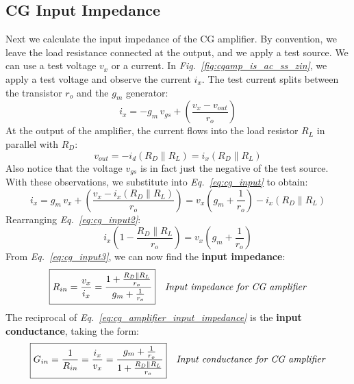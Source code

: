 \subsection{CG Input Impedance}
Next we calculate the input impedance of the CG amplifier.  By convention, we leave the load resistance connected at the output, and we apply a test source.  We can use a test voltage $v_x$ or a current.  In \emph{Fig.~\ref{fig:cgamp_is_ac_ss_zin}}, we apply a test voltage and observe the current $i_x$.  The test current splits between the transistor $r_o$ and the $g_m$ generator:
    \begin{equation}
        i_x = -g_m\,v_{gs} + \left(\frac{v_x - v_{out}}{r_o}\right)
        \label{eq:cg_input}
    \end{equation}
At the output of the amplifier, the current flows into the load resistor $R_L$ in parallel with $R_D$:
    \begin{equation}
        v_{out} = -i_d\left(R_D \parallel R_L\right) = i_x\left(R_D \parallel R_L\right)
    \end{equation}
Also notice that the voltage $v_{gs}$ is in fact just the negative of the test source.  With these observations, we substitute into \emph{Eq.~\ref{eq:cg_input}} to obtain:
    \begin{equation}
        i_x = g_m\,v_x + \left(\frac{v_x - i_x\left(R_D \parallel R_L\right)}{r_o}\right)
        = v_x\left(g_m + \frac{1}{r_o}\right) - i_x\left(R_D \parallel R_L\right)
        \label{eq:cg_input2}
    \end{equation}
Rearranging \emph{Eq.~\ref{eq:cg_input2}}:
    \begin{equation}
        i_x\left(1 - \frac{R_D \parallel R_L}{r_o}\right) = v_x\left(g_m + \frac{1}{r_o}\right)
        \label{eq:cg_input3}
    \end{equation}
From \emph{Eq.~\ref{eq:cg_input3}}, we can now find the \textbf{input impedance}:
    \begin{align}
        \Aboxed{R_{in} &= \frac{v_x}{i_x} = \frac{1 + \frac{R_D \parallel R_L}{r_o}}{g_m + \frac{1}{r_o}}}
        &\textit{Input impedance for CG amplifier}
        \label{eq:cg_amplifier_input_impedance}
    \end{align}
The reciprocal of \emph{Eq.~\ref{eq:cg_amplifier_input_impedance}} is the \textbf{input conductance}, taking the form:
    \begin{align}
        \Aboxed{G_{in} &= \frac{1}{R_{in}} = \frac{i_x}{v_x} = \frac{g_m + \frac{1}{r_o}}{1 + \frac{R_D \parallel R_L}{r_o}}}
        &\textit{Input conductance for CG amplifier}
        \label{eq:cg_amplifier_input_conductance}
    \end{align}
